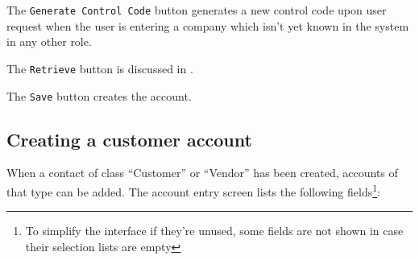 The \texttt{Generate Control Code} button generates a new control code upon
user request when the user is entering a company which isn't yet known
in the system in any other role.

The \texttt{Retrieve} button is discussed in .

The \texttt{Save} button creates the account.

\subsection{Creating a customer account}
\label{subsec-business-processes-customers-creating-account}

When a contact of class ``Customer'' or ``Vendor'' has been created,
accounts of that type can be added. The account entry screen lists the
following fields\footnote{To simplify the interface if they're unused, some fields
are not shown in case their selection lists are empty}:

